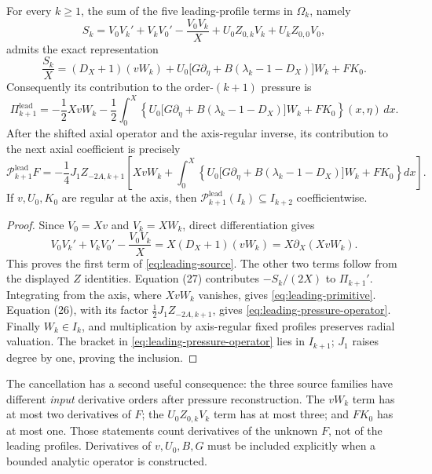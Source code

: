 \begin{proposition}
\label{prop:leading-cancellation}
For every $k\ge1$, the sum of the five leading-profile terms in
$\Omega_k$, namely
\[
 S_k=V_0V_k'+V_kV_0'-\frac{V_0V_k}{X}
     +U_0Z_{0,k}V_k+U_kZ_{0,0}V_0,
\]
admits the exact representation
\begin{equation}\label{eq:leading-source}
 \frac{S_k}{X}=(D_X+1)(vW_k)
     +U_0\bigl[G\partial_\eta+B(\lambda_k-1-D_X)\bigr]W_k
     +FK_0.
\end{equation}
Consequently its contribution to the order-$(k+1)$ pressure is
\begin{equation}\label{eq:leading-primitive}
 \Pi_{k+1}^{\mathrm{lead}}
 =-\frac12 XvW_k-\frac12\int_0^X
 \left\{U_0\bigl[G\partial_\eta+B(\lambda_k-1-D_X)\bigr]W_k
     +FK_0\right\}(x,\eta)\,dx.
\end{equation}
After the shifted axial operator and the axis-regular inverse, its
contribution to the next axial coefficient is precisely
\begin{equation}\label{eq:leading-pressure-operator}
 \mathcal P_{k+1}^{\mathrm{lead}}F
 =-\frac14 J_1 Z_{-2A,k+1}
 \left[XvW_k+\int_0^X
 \left\{U_0\bigl[G\partial_\eta+B(\lambda_k-1-D_X)\bigr]W_k
   +FK_0\right\}dx\right].
\end{equation}
If $v,U_0,K_0$ are regular at the axis, then
$\mathcal P_{k+1}^{\mathrm{lead}}(I_k)\subseteq I_{k+2}$
coefficientwise.
\end{proposition}
\begin{proof}
Since $V_0=Xv$ and $V_k=XW_k$, direct differentiation gives
\[
 V_0V_k'+V_kV_0'-\frac{V_0V_k}{X}
   =X(D_X+1)(vW_k)=X\partial_X(XvW_k).
\]
This proves the first term of \eqref{eq:leading-source}. The other
two terms follow from the displayed $Z$ identities. Equation (27)
contributes $-S_k/(2X)$ to $\Pi_{k+1}'$.
Integrating from the axis, where $XvW_k$ vanishes, gives
\eqref{eq:leading-primitive}. Equation (26), with its factor
$\frac12J_1 Z_{-2A,k+1}$, gives
\eqref{eq:leading-pressure-operator}.
Finally $W_k\in I_k$, and multiplication by axis-regular fixed
profiles preserves radial valuation. The bracket in
\eqref{eq:leading-pressure-operator} lies in $I_{k+1}$;
$J_1$ raises degree by one, proving the inclusion.
\end{proof}

The cancellation has a second useful consequence: the three source
families have different \emph{input} derivative orders after pressure
reconstruction. The $vW_k$ term has at most two derivatives of $F$;
the $U_0Z_{0,k}V_k$ term has at most three; and $FK_0$ has at most one.
Those statements count derivatives of the unknown $F$, not of the
leading profiles. Derivatives of $v,U_0,B,G$ must be included
explicitly when a bounded analytic operator is constructed.

